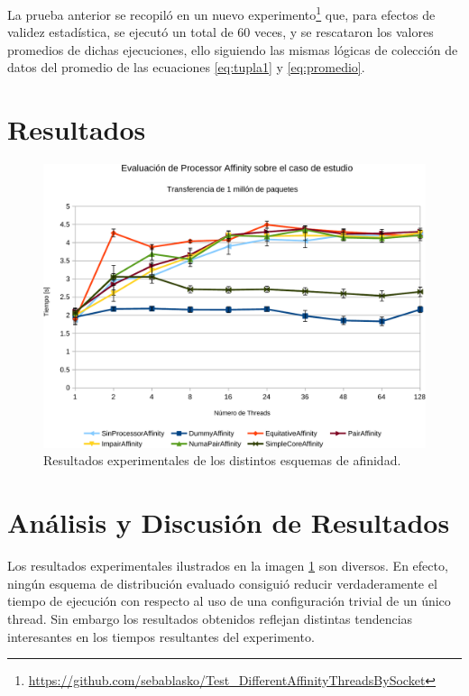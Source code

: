 La prueba anterior se recopiló en un nuevo experimento\footnote{\url{https://github.com/sebablasko/Test_DifferentAffinityThreadsBySocket}} que, para efectos de validez estadística, se ejecutó un total de 60 veces, y se rescataron los valores promedios de dichas ejecuciones, ello siguiendo las mismas lógicas de colección de datos del promedio de las ecuaciones \ref{eq:tupla1} y \ref{eq:promedio}.

\newpage

\section{Resultados}

\begin{figure}[h!]
	\centering
	\includegraphics[scale=.6]{resultados/processoraffinity-crop.pdf}
	\caption{Resultados experimentales de los distintos esquemas de afinidad.}
	\label{fig:resAffinity}
\end{figure}

\section{Análisis y Discusión de Resultados}
Los resultados experimentales ilustrados en la imagen \ref{fig:resAffinity} son diversos. En efecto, ningún esquema de distribución evaluado consiguió reducir verdaderamente el tiempo de ejecución con respecto al uso de una configuración trivial de un único thread. Sin embargo los resultados obtenidos reflejan distintas tendencias interesantes en los tiempos resultantes del experimento.

